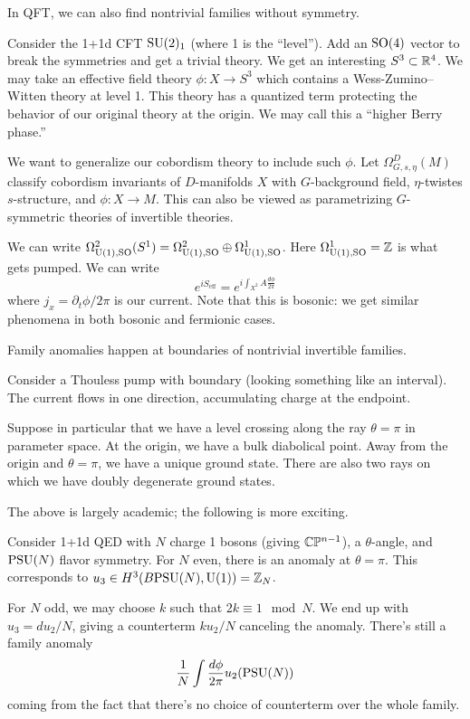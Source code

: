 In QFT, we can also find nontrivial families without symmetry.

\begin{ex}
	Consider the 1+1d CFT $\mathrm{SU}(2)_1$ (where 1 is the ``level'').
	Add an $\mathrm{SO}(4)$ vector to break the symmetries and get a trivial theory.
	We get an interesting $S^3 \subset \mathbb{R}^4$.
	We may take an effective field theory $\phi: X \to S^3$ which contains a Wess-Zumino--Witten theory at level 1.
	This theory has a quantized term protecting the behavior of our original theory at the origin.
	We may call this a ``higher Berry phase.''
\end{ex}

We want to generalize our cobordism theory to include such $\phi$.
Let $\Omega^D_{G,s,\eta}(M)$ classify cobordism invariants of $D$-manifolds $X$ with $G$-background field, $\eta$-twistes $s$-structure, and $\phi: X \to M$.
This can also be viewed as parametrizing $G$-symmetric theories of invertible theories.

\begin{ex}
	We can write $\Omega^2_{\mathrm{U}(1),\mathrm{SO}}(S^1) = \Omega^2_{\mathrm{U}(1),\mathrm{SO}} \oplus \Omega^1_{\mathrm{U}(1),\mathrm{SO}}$.
	Here $\Omega^1_{\mathrm{U}(1),\mathrm{SO}} = \mathbb{Z}$ is what gets pumped.
	We can write
	\[
		e^{i S_{\textrm{eff}}} = e^{i \int_{X^2} A \frac{d\phi}{2\pi}}
	\]
	where $j_x = \partial_t \phi / 2\pi$ is our current.
	Note that this is bosonic: we get similar phenomena in both bosonic and fermionic cases.
\end{ex}

Family anomalies happen at boundaries of nontrivial invertible families.

\begin{ex}
	Consider a Thouless pump with boundary (looking something like an interval).
	The current flows in one direction, accumulating charge at the endpoint.

	Suppose in particular that we have a level crossing along the ray $\theta = \pi$ in parameter space.
	At the origin, we have a bulk diabolical point.
	Away from the origin and $\theta = \pi$, we have a unique ground state.
	There are also two rays on which we have doubly degenerate ground states.
\end{ex}

The above is largely academic; the following is more exciting.

\begin{ex}
	Consider 1+1d QED with $N$ charge 1 bosons (giving $\mathbb{C}\mathbb{P}^{n-1}$), a $\theta$-angle, and $\mathrm{PSU}(N)$ flavor symmetry.
	For $N$ even, there is an anomaly at $\theta = \pi$.
	This corresponds to $u_3 \in H^3(B\mathrm{PSU}(N), \mathrm{U}(1)) = \mathbb{Z}_N$.

	For $N$ odd, we may choose $k$ such that $2k \equiv 1 \mod N$.
	We end up with $u_3 = d u_2 / N$, giving a counterterm $k u_2 / N$ canceling the anomaly.
	There's still a family anomaly 
	\[
		\frac{1}{N} \int \frac{d\phi}{2\pi} u_2(\mathrm{PSU}(N))
	\]
	coming from the fact that there's no choice of counterterm over the whole family.
\end{ex}

